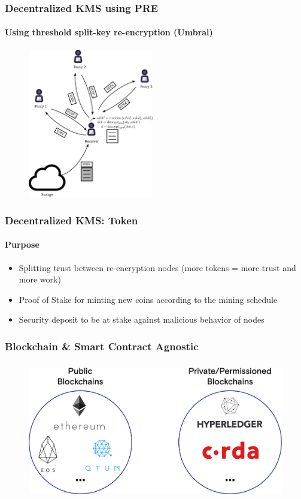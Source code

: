\documentclass[xetex,mathsans,sans,aspectratio=169]{beamer}
\begin{document}
    \begin{frame}
        \frametitle{Decentralized KMS using PRE}
        \framesubtitle{Using threshold split-key re-encryption (Umbral)}
        \begin{figure}
            \centering
            \includegraphics[height=6.5cm]{pdf/decrypt-umbral.pdf}
        \end{figure}
    \end{frame}

    \begin{frame}
        \frametitle{Decentralized KMS: Token}
        \framesubtitle{Purpose}
        \begin{itemize}
            \item Splitting trust between re-encryption nodes (more tokens = more trust and more work)
            \item Proof of Stake for minting new coins according to the mining schedule
            \item Security deposit to be at stake against malicious behavior of nodes
        \end{itemize}
    \end{frame}

    \begin{frame}
        \frametitle{Blockchain \& Smart Contract Agnostic}
        \begin{figure}
            \centering
            \includegraphics[height=6cm]{pdf/blockchains.pdf}
        \end{figure}
    \end{frame}
\end{document}
